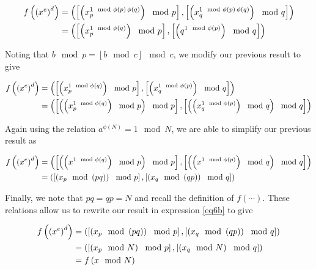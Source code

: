 \documentclass[../CryptoFinal.tex]{subfiles}
\begin{document}
\begin{flushleft}
\begin{align}
  f \left( \left( x^e \right)^d \right) &= \left( \left[ \left( x_p^{1 \mod \phi \left( p \right) \, \phi \left( q \right)} \right) \mod p \right], \left[ \left( x_	q^{1 \mod \phi \left( p \right) \, \phi \left( q \right)} \right) \mod q \right] \right) \notag \\
  &= \left( \left[ \left( x_p^{1 \mod \phi \left( q \right)} \right) \mod p \right], \left[ \left( q^{1 \mod \phi \left( p \right)} \right) \mod q \right] \right) \notag
\end{align}

Noting that $b \mod p = \left[ b \mod c \right] \mod c$, we modify our previous result to give

\begin{align}
  f \left( \left( x^e \right)^d \right) &= \left( \left[ \left( x_p^{1 \mod \phi \left( q \right)} \right) \mod p \right], \left[ \left( x_q^{1 \mod \phi \left( p \right)} \right) \mod q \right] \right) \notag \\
  &= \left( \left[ \left( \left( x_p^{1 \mod \phi \left( q \right)} \right) \mod p \right) \mod p \right], \left[ \left( \left( x_q^{1 \mod \phi \left( p \right)} \right) \mod q \right) \mod q \right] \right) \notag
\end{align}

Again using the relation $a^{\phi \left( N \right)} = 1 \mod N$, we are able to simplify our previous result as

\begin{align}
  f \left( \left( x^e \right)^d \right) &= \left( \left[ \left( \left( x^{1 \mod \phi \left( q \right)} \right) \mod p \right) \mod p \right], \left[ \left( \left( x^{1 \mod \phi \left( p \right)} \right) \mod q \right) \mod q \right] \right) \notag \\
  &= \left( \left[ \left( x_p \mod \left( p q \right) \right) \mod p \right], \left[ \left( x_q \mod \left( q p \right) \right) \mod q \right] \right) \label{eq6b}
\end{align}

Finally, we note that $p q = q p = N$ and recall the definition of $f \left( \cdots \right)$.  These relations allow us to rewrite our result in expression \ref{eq6b} to give

\begin{align}
  f \left( \left( x^e \right)^d \right) &= \left( \left[ \left( x_p \mod \left( p q \right) \right) \mod p \right], \left[ \left( x_q \mod \left( q p \right) \right) \mod q \right] \right) \notag \\
  &= \left( \left[ \left( x_p \mod N \right) \mod p \right], \left[ \left( x_q \mod N \right) \mod q \right] \right) \notag \\
  &= f \left( x \mod N \right) \notag
\end{align}


\end{flushleft}
\end{document}
